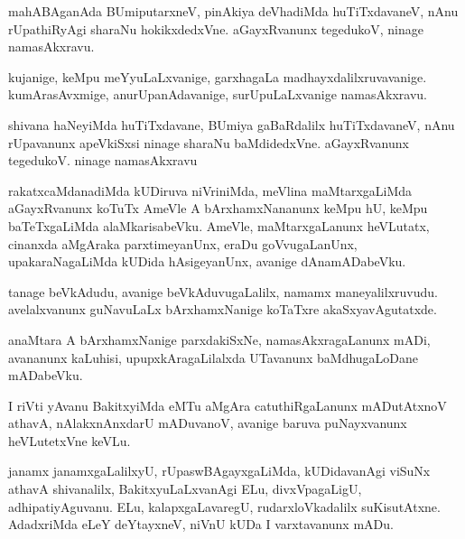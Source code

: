 \documentclass{article}
\begin{document}
\begin{mn}
mahABAganAda  BUmiputarxneV,  pinAkiya  deVhadiMda  huTiTxdavaneV,  nAnu  rUpathiRyAgi  sharaNu  
hokikxdedxVne.  aGayxRvanunx  tegedukoV,  ninage  namasAkxravu.
\end{mn}

\begin{mn}
kujanige,  keMpu  meYyuLaLxvanige,  garxhagaLa  madhayxdalilxruvavanige.  kumArasAvxmige,  
anurUpanAdavanige,  surUpuLaLxvanige  namasAkxravu.
\end{mn}

\begin{mn}
shivana haNeyiMda  huTiTxdavane,  BUmiya  gaBaRdalilx  huTiTxdavaneV,  nAnu  rUpavanunx  
apeVkiSxsi  ninage  sharaNu baMdidedxVne.  aGayxRvanunx  tegedukoV.  ninage  namasAkxravu
\end{mn}

\begin{mn}
rakatxcaMdanadiMda  kUDiruva  niVriniMda,  meVlina  maMtarxgaLiMda  aGayxRvanunx  koTuTx  
AmeVle  A  bArxhamxNananunx  keMpu  hU,  keMpu  baTeTxgaLiMda  alaMkarisabeVku.  AmeVle,  
maMtarxgaLanunx  heVLutatx,  cinanxda  aMgAraka  parxtimeyanUnx,  eraDu  goVvugaLanUnx,  
upakaraNagaLiMda  kUDida  hAsigeyanUnx,  avanige  dAnamADabeVku.
\end{mn}

\begin{mn}
tanage  beVkAdudu,  avanige  beVkAduvugaLalilx,  namamx  maneyalilxruvudu.  avelalxvanunx  
guNavuLaLx  bArxhamxNanige  koTaTxre  akaSxyavAgutatxde.
\end{mn}

\begin{mn}
anaMtara  A  bArxhamxNanige  parxdakiSxNe,  namasAkxragaLanunx  mADi,  avananunx  kaLuhisi,  
upupxkAragaLilalxda  UTavanunx  baMdhugaLoDane  mADabeVku.
\end{mn}

\begin{mn}
I riVti  yAvanu  BakitxyiMda  eMTu  aMgAra catuthiRgaLanunx  mADutAtxnoV  athavA,  nAlakxnAnxdarU  
mADuvanoV,  avanige  baruva  puNayxvanunx  heVLutetxVne  keVLu.
\end{mn}

\begin{mn}
janamx  janamxgaLalilxyU,  rUpaswBAgayxgaLiMda,  kUDidavanAgi  viSuNx  athavA  shivanalilx,  
BakitxyuLaLxvanAgi  ELu,  divxVpagaLigU,  adhipatiyAguvanu.  ELu,  kalapxgaLavaregU,  
rudarxloVkadalilx  suKisutAtxne.  AdadxriMda  eLeY  deYtayxneV,  niVnU  kUDa  I  varxtavanunx  mADu.
\end{mn}
\end{document}

